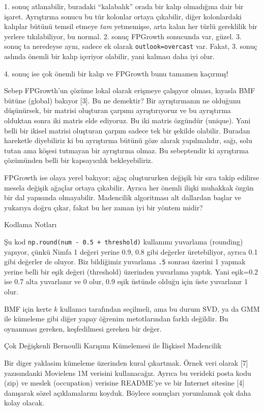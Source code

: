 \documentclass[12pt,fleqn]{article}\usepackage{../../common}
\begin{document}
1. sonuç atlanabilir, buradaki ``kalabalık'' orada bir kalıp olmadığına
dair bir işaret. Ayrıştırma sonucu bu tür kolonlar ortaya çıkabilir, diğer
kolonlardaki kalıplar bütünü temsil etmeye {\em tam} yetmemişse, arta kalan
her türlü gereklilik bir yerlere tıkılabiliyor, bu normal. 2. sonuç
FPGrowth sonucunda var, güzel. 3. sonuç ta neredeyse aynı, sadece ek olarak
\verb!outlook=overcast! var. Fakat, 3. sonuç aslında önemli bir kalıp
içeriyor olabilir, yani kalması daha iyi olur.

4. sonuç ise çok önemli bir kalıp ve FPGrowth bunu tamamen kaçırmış!

Sebep FPGrowth'un çözüme lokal olarak erişmeye çalışıyor olması, kıyasla
BMF bütüne (global) bakıyor [3]. Bu ne demektir? Bir ayrıştırmanın ne
olduğunu düşünürsek, bir matrisi oluşturan çarpımı ayrıştırıyoruz ve bu
ayrıştırma olduktan sonra iki matris elde ediyoruz. Bu iki matris özgündür 
(unique). Yani belli bir ikisel matrisi oluşturan çarpım sadece tek bir
şekilde olabilir. Buradan hareketle diyebiliriz ki bu ayrıştırma bütünü
göze alarak yapılmalıdır, sağı, solu tutan ama köşesi tutmayan bir
ayrıştırma olmaz. Bu sebeptendir ki ayrıştırma çözümünden belli bir
kapsayıcılık bekleyebiliriz.

FPGrowth ise olaya yerel bakıyor; ağaç oluştururken değişik bir sıra takip
edilirse mesela değişik ağaçlar ortaya çıkabilir. Ayrıca her önemli ilişki
muhakkak özgün bir dal yapısında olmayabilir. Madencilik algoritması alt
dallardan başlar ve yukarıya doğru çıkar, fakat bu her zaman iyi bir yöntem
midir?

Kodlama Notları

Şu kod \verb!np.round(num - 0.5 + threshold)! kullanımı yuvarlama
(rounding) yapıyor, çünkü Nimfa 1 değeri yerine 0.9, 0.8 gibi değerler
üretebiliyor, ayrıca 0.1 gibi değerler de oluyor. Biz bildiğimiz yuvarlama
\verb!.5!  sonrası üzerini 1 yapmak yerine belli bir eşik değeri
(threshold) üzerinden yuvarlama yaptık. Yani eşik=0.2 ise 0.7 alta
yuvarlanır ve 0 olur, 0.9 eşik üstünde olduğu için üste yuvarlanır 1 olur.

BMF için kerte $k$ kullanıcı tarafından seçilmeli, ama bu durum SVD, ya da
GMM ile kümeleme gibi diğer yapay öğrenim metotlarından farklı değildir. Bu
oynanması gereken, keşfedilmesi gereken bir değer.

Çok Değişkenli Bernoulli Karışımı Kümelemesi ile İlişkisel Madencilik

Bir diger yaklasim kümeleme üzerinden kural çıkartmak. Örnek veri olarak
[7] yazısındanki Movielens 1M verisini kullanacağız. Ayrıca bu verideki
posta kodu (zip) ve meslek (occupation) verisine README'ye ve bir Internet
sitesine [4] danışarak sözel açıklamalarını koyduk. Böylece sonuçları
yorumlamak çok daha kolay olacak.
\end{document}
